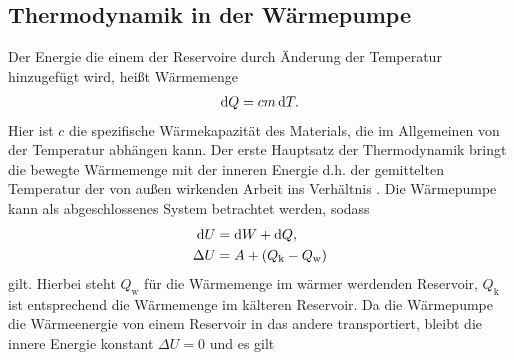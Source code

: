 \subsection{Thermodynamik in der Wärmepumpe}

Der Energie die einem der Reservoire durch Änderung der Temperatur hinzugefügt wird,
heißt Wärmemenge
\begin{align}
    \mathop{}\!\mathrm{d} Q = c m \mathop{}\!\mathrm{d} T.
    \label{eq:dQ}
\end{align} 
Hier ist $ c $ die spezifische Wärmekapazität des Materials,
 die im Allgemeinen von der Temperatur abhängen kann.
Der erste Hauptsatz der Thermodynamik bringt die bewegte Wärmemenge
mit der inneren Energie d.h. der gemittelten Temperatur der von außen wirkenden Arbeit
ins Verhältnis \cite[vgl][318]{demtroeder}. 
Die Wärmepumpe kann als abgeschlossenes System betrachtet werden, sodass 
\begin{align}
                \mathop{}\!\mathrm{d} U &= \mathop{}\!\mathrm{d} W + \mathop{}\!\mathrm{d} Q, \\
    \nonumber   \Delta U &= A + ( Q_\text{k} - Q_\text{w})
\end{align}
gilt.
Hierbei steht $Q_\text{w}$ für die Wärmemenge im wärmer werdenden Reservoir, $Q_\text{k}$ ist entsprechend die Wärmemenge im kälteren Reservoir.
Da die Wärmepumpe die Wärmeenergie von einem Reservoir in das andere transportiert,
    bleibt die innere Energie konstant $ \Delta U = 0 $ und es gilt

